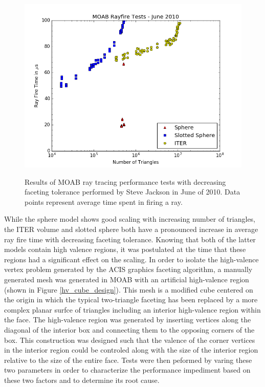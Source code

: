 \documentclass[12pt, a4paper]{article}
\begin{document}
\begin{figure}[H]
  \begin{center}
    \includegraphics[scale=0.5]{SJ_tests_2010.png} \\
    \caption{Results of MOAB ray tracing performance tests with decreasing faceting tolerance performed by Steve Jackson in June of 2010. Data points represent average time spent in firing a ray.}
    \label{sj_tests}
  \end{center}
\end{figure}

While the sphere model shows good scaling with increasing number of triangles, the ITER volume and slotted sphere both have a pronounced increase in average ray fire time with decreasing faceting tolerance. Knowing that both of the latter models contain high valence regions, it was postulated at the time that these regions had a significant effect on the scaling. In order to isolate the high-valence vertex problem generated by the ACIS graphics faceting algorithm, a manually generated mesh was generated in MOAB with an artificial high-valence region (shown in Figure \ref{hv_cube_design}). This mesh is a modified cube centered on the origin in which the typical two-triangle faceting has been replaced by a more complex planar surfce of triangles including an interior high-valence region within the face. The high-valence region was generated by inserting vertices along the diagonal of the interior box and connecting them to the opposing corners of the box. This construction was designed such that the valence of the corner vertices in the interior region could be controled along with the size of the interior region relative to the size of the entire face. Tests were then peformed by varing these two parameters in order to characterize the performance impediment based on these two factors and to determine its root cause.
\end{document}
